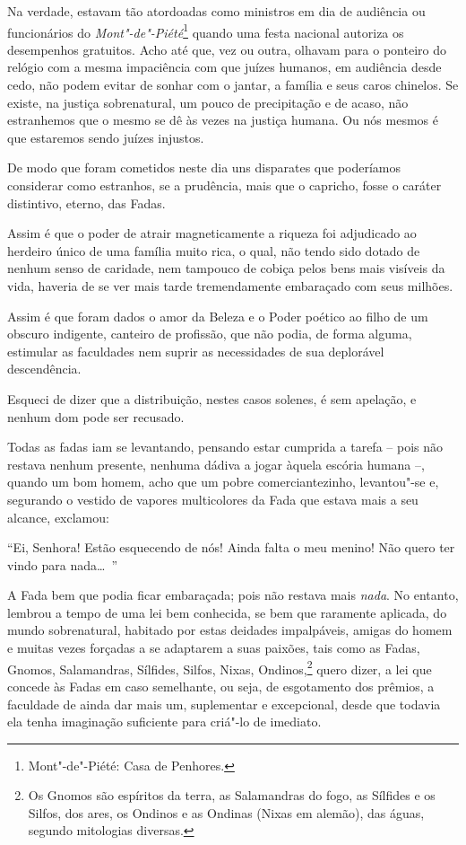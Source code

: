 Na verdade, estavam tão atordoadas como ministros em dia de
audiência ou funcionários do \textit{Mont"-de"-Piété}\footnote{ Mont"-de"-Piété: Casa de Penhores.}
quando uma festa nacional autoriza os desempenhos gratuitos.  Acho até que, vez ou outra, olhavam para o ponteiro do relógio com a mesma
impaciência com que juízes humanos, em audiência desde cedo, não
podem evitar de sonhar com o jantar, a família e seus caros
chinelos. Se existe, na justiça sobrenatural, um pouco de precipitação
e de acaso, não estranhemos que o mesmo se dê às vezes na justiça
humana. Ou nós mesmos é que estaremos sendo juízes injustos.

De modo que foram cometidos neste dia uns disparates que poderíamos
considerar como estranhos, se a prudência, mais que o capricho, fosse o
caráter distintivo, eterno, das Fadas.

Assim é que o poder de atrair magneticamente a riqueza foi adjudicado ao
herdeiro único de uma família muito rica, o qual, não tendo sido dotado
de nenhum senso de caridade, nem tampouco de cobiça pelos bens
mais visíveis da vida, haveria de se ver mais tarde tremendamente
embaraçado com seus milhões.

Assim é que foram dados o amor da Beleza e o Poder poético ao filho de um
obscuro indigente, canteiro de profissão, que não podia, de forma
alguma, estimular as faculdades nem suprir as necessidades de sua
deplorável descendência.

Esqueci de dizer que a distribuição, nestes casos solenes, é sem
apelação, e nenhum dom pode ser recusado.

Todas as fadas iam se levantando, pensando estar cumprida a tarefa
– pois não restava nenhum presente, nenhuma dádiva a jogar àquela escória humana –, quando um bom homem, acho que um pobre
comerciantezinho, levantou"-se e, segurando o vestido de vapores
multicolores da Fada que estava mais a seu alcance, exclamou:

“Ei, Senhora! Estão esquecendo de nós! Ainda falta
o meu menino! Não quero ter vindo para nada\ldots\ ”

A Fada bem que podia ficar embaraçada; pois não restava mais \textit{nada}. No
entanto, lembrou a tempo de uma lei bem conhecida, se bem que raramente
aplicada, do mundo sobrenatural, habitado por estas deidades
impalpáveis, amigas do homem e muitas vezes forçadas a se adaptarem a
suas paixões, tais como as Fadas, Gnomos, Salamandras,
Sílfides, Silfos, Nixas, Ondinos,\footnote{ Os Gnomos são espíritos da terra, as Salamandras do fogo, as Sílfides
e os Silfos, dos ares, os Ondinos e as Ondinas (Nixas em alemão), das
águas, segundo mitologias diversas.} quero dizer, a lei que concede às Fadas em
caso semelhante, ou seja, de esgotamento dos prêmios, a
faculdade de ainda dar mais um, suplementar e excepcional, desde que todavia
ela tenha imaginação suficiente para criá"-lo de imediato.

